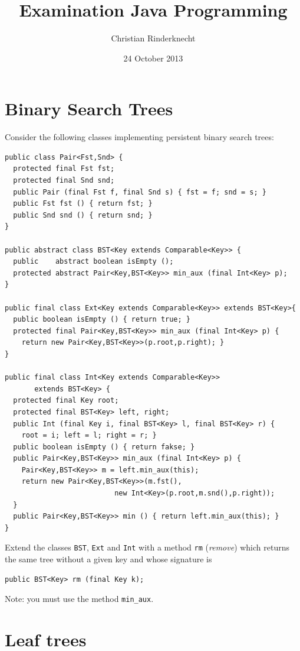 \documentclass[11pt,a4paper]{article}
\title{Examination Java Programming}
\author{Christian Rinderknecht}
\date{24 October 2013}
\begin{document}
\maketitle

\section{Binary Search Trees}

\noindent Consider the following classes implementing persistent
binary search trees:
{\small
\begin{verbatim}
public class Pair<Fst,Snd> {
  protected final Fst fst;
  protected final Snd snd;
  public Pair (final Fst f, final Snd s) { fst = f; snd = s; }
  public Fst fst () { return fst; }
  public Snd snd () { return snd; }
}

public abstract class BST<Key extends Comparable<Key>> {
  public    abstract boolean isEmpty ();
  protected abstract Pair<Key,BST<Key>> min_aux (final Int<Key> p);
}

public final class Ext<Key extends Comparable<Key>> extends BST<Key>{
  public boolean isEmpty () { return true; }
  protected final Pair<Key,BST<Key>> min_aux (final Int<Key> p) {
    return new Pair<Key,BST<Key>>(p.root,p.right); }
}

public final class Int<Key extends Comparable<Key>>
       extends BST<Key> {
  protected final Key root;
  protected final BST<Key> left, right;
  public Int (final Key i, final BST<Key> l, final BST<Key> r) {
    root = i; left = l; right = r; }
  public boolean isEmpty () { return fakse; }
  public Pair<Key,BST<Key>> min_aux (final Int<Key> p) {
    Pair<Key,BST<Key>> m = left.min_aux(this);
    return new Pair<Key,BST<Key>>(m.fst(),
                          new Int<Key>(p.root,m.snd(),p.right));
  }
  public Pair<Key,BST<Key>> min () { return left.min_aux(this); }
}
\end{verbatim}
}
Extend the classes \texttt{BST}, \texttt{Ext} and \texttt{Int} with a method \texttt{rm} (\emph{remove}) which returns the same tree without a given key and whose signature is
\begin{verbatim}
public BST<Key> rm (final Key k);
\end{verbatim}
Note: you must use the method \texttt{min\_aux}.

\section{Leaf trees}
\end{document}
